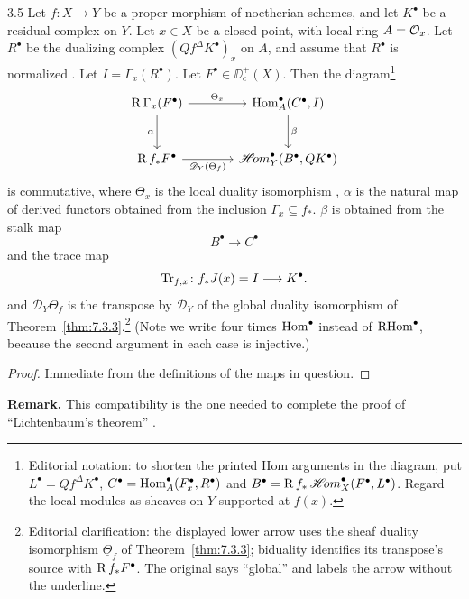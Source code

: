 \begin{samepage}
\begin{bookproposition}{3.5}\label{prop:7.3.5}
Let $f: X \to Y$ be a proper morphism of noetherian schemes, and let $K^{\bullet}$ be a residual complex on $Y$. Let $x \in X$ be a closed point, with local ring $A = \mathcal{O}_{x}$. Let $R^{\bullet}$ be the dualizing complex $(Q f^{\Delta} K^{\bullet})_{x}$ on $A$, and assume that $R^{\bullet}$ is normalized . Let $I = \Gamma_{x}(R^{\bullet})$. Let $F^{\bullet} \in \DD_{\mathrm{c}}^{+}(X)$. Then the diagram\footnote{Editorial notation: to shorten the printed Hom arguments in the diagram, put $L^\bullet=Qf^\Delta K^\bullet$, $C^\bullet=\operatorname{Hom}_A^\bullet(F_x^\bullet,R^\bullet)$ and $B^\bullet=\operatorname{R} f_*\mathop{\mathscr{H}\!om}\nolimits_X^\bullet(F^\bullet,L^\bullet)$. Regard the local modules as sheaves on $Y$ supported at $f(x)$.}
\[
\begin{tikzcd}[row sep=large,column sep=large]
\RR\Gamma_x(F^\bullet) \ar[r,"\Theta_x"] \ar[d,"\alpha"']
 & \Hom_A^\bullet(C^\bullet,I) \ar[d,"\beta"] \\
\RR f_*F^\bullet \ar[r,"\mathscr{D}_Y(\Theta_f)"']
 & \sheafHom_Y^\bullet(B^\bullet,QK^\bullet)
\end{tikzcd}
\]
is commutative, where $\Theta_x$ is the local duality isomorphism
, $\alpha$ is the natural map of derived functors obtained from the inclusion
$\Gamma_x\subseteq f_*$. $\beta$ is obtained from the stalk map
\[
B^\bullet\longrightarrow C^\bullet
\]
and the trace map
\[
\operatorname{Tr}_{f,x}\colon f_*J(x)=I\longrightarrow K^\bullet.
\]
and $\mathscr{D}_Y\Theta_f$ is the transpose by $\mathscr{D}_Y$ of the global duality isomorphism of Theorem~\ref{thm:7.3.3}.\footnote{Editorial clarification: the displayed lower arrow uses the sheaf duality isomorphism $\underline{\Theta}_f$ of Theorem~\ref{thm:7.3.3}; biduality identifies its transpose's source with $\operatorname{R} f_*F^\bullet$. The original says ``global'' and labels the arrow without the underline.} (Note we write four times $\operatorname{Hom}^\bullet$ instead of $\operatorname{RHom}^\bullet$, because the second argument in each case is injective.)
\end{bookproposition}
\end{samepage}

\begin{proof}
Immediate from the definitions of the maps in question.
\end{proof}

\par\medskip\noindent\textbf{Remark.}
This compatibility is the one needed to complete the proof of ``Lichtenbaum's theorem'' \cite[\nopp Thm.~6.9; see the parenthetical remark on p.~103]{LC}.
\par\medskip

